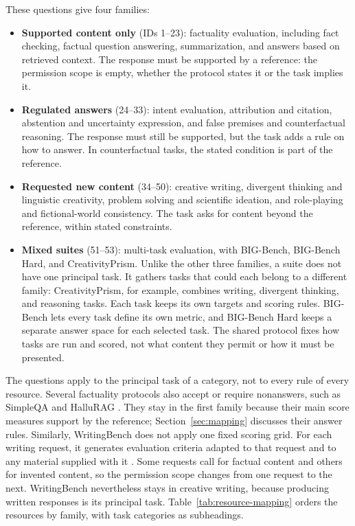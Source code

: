 \documentclass{clv2025}
\begin{document}
These questions give four families:
\begin{itemize}
\item \textbf{Supported content only} (IDs 1--23): factuality evaluation,
including fact checking, factual question answering, summarization, and
answers based on retrieved context. The response must be supported by a
reference: the permission scope is empty, whether the protocol states it
or the task implies it.
\item \textbf{Regulated answers} (24--33): intent evaluation, attribution
and citation, abstention and uncertainty expression, and false premises and
counterfactual reasoning. The response must still be supported, but the
task adds a rule on how to answer. In counterfactual tasks, the stated
condition is part of the reference.
\item \textbf{Requested new content} (34--50): creative writing, divergent
thinking and linguistic creativity, problem solving and scientific
ideation, and role-playing and fictional-world consistency. The task asks
for content beyond the reference, within stated constraints.
\item \textbf{Mixed suites} (51--53): multi-task evaluation, with
BIG-Bench, BIG-Bench Hard, and CreativityPrism. Unlike the other three
families, a suite does not have one principal task. It gathers tasks that
could each belong to a different family: CreativityPrism, for example,
combines writing, divergent thinking, and reasoning tasks. Each task keeps
its own targets and scoring rules. BIG-Bench lets every task define its own
metric, and BIG-Bench Hard keeps a separate answer space for each selected
task. The shared protocol fixes how tasks are run and scored, not what
content they permit or how it must be presented.
\end{itemize}

The questions apply to the principal task of a category, not to every
rule of every resource. Several factuality protocols also accept or require
nonanswers, such as SimpleQA and HalluRAG
\citep{wei_measuring_2024,ridder_hallurag_2025}. They stay in the first
family because their main score measures support by the reference;
Section~\ref{sec:mapping} discusses their answer rules. Similarly,
WritingBench does not apply one fixed scoring grid. For each writing
request, it generates evaluation criteria adapted to that request and to
any material supplied with it \citep{wu_writingbench_2025}. Some requests
call for factual content and others for invented content, so the
permission scope changes from one request to the next. WritingBench
nevertheless stays in creative writing, because producing written
responses is its principal task.
Table~\ref{tab:resource-mapping} orders the resources by family, with task
categories as subheadings.
\end{document}
